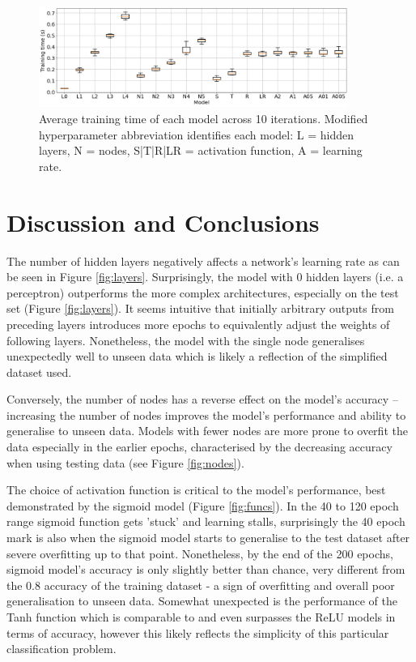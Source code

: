 \documentclass[12pt]{article}
\begin{document}
\begin{figure}[H]
  \centering
  \includegraphics[width=0.9\textwidth]{figs/times.png}
  \caption{
    Average training time of each model across 10 iterations.
    Modified hyperparameter abbreviation identifies each model:
    L = hidden layers, N = nodes, S|T|R|LR = activation function,
    A = learning rate.
  }
  \label{fig:times}
\end{figure}

\vspace{-1.5em}
\section{Discussion and Conclusions}
\vspace{-1.5em}

The number of hidden layers negatively affects a network's learning rate as can be seen in Figure \ref{fig:layers}. Surprisingly, the model with 0 hidden layers (i.e. a perceptron) outperforms the more complex architectures, especially on the test set (Figure \ref{fig:layers}). It seems intuitive that initially arbitrary outputs from preceding layers introduces more epochs to equivalently adjust the weights of following layers. Nonetheless, the model with the single node generalises unexpectedly well to unseen data which is likely a reflection of the simplified dataset used.

Conversely, the number of nodes has a reverse effect on the model's accuracy -- increasing the number of nodes improves the model's performance and ability to generalise to unseen data. Models with fewer nodes are more prone to overfit the data especially in the earlier epochs, characterised by the decreasing accuracy when using testing data (see Figure \ref{fig:nodes}).

The choice of activation function is critical to the model's performance, best demonstrated by the sigmoid model (Figure \ref{fig:funcs}). In the 40 to 120 epoch range sigmoid function gets 'stuck' and learning stalls, surprisingly the 40 epoch mark is also when the sigmoid model starts to generalise to the test dataset after severe overfitting up to that point. Nonetheless, by the end of  the 200 epochs, sigmoid model's accuracy is only slightly better than chance, very different from the 0.8 accuracy of the training dataset - a sign of overfitting and overall poor generalisation to unseen data.
Somewhat unexpected is the performance of the Tanh function which is comparable to and even surpasses the ReLU models in terms of accuracy, however this likely reflects the simplicity of this particular classification problem.
\end{document}
